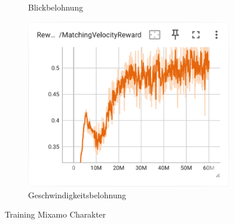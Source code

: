 \begin{figure}[H]
\begin{subfigure}{.49\textwidth}
      \caption{Blickbelohnung}
      \label{fig:106_look_reward}
    \end{subfigure}
    \begin{subfigure}{.49\textwidth}
      \centering  
      \includegraphics[width=\textwidth]{img/106_vel_reward}
      \caption{Geschwindigkeitsbelohnung}
      \label{fig:106_vel_reward}
    \end{subfigure}
 \caption{Training Mixamo Charakter}
  \label{fig:training_mixamo_charakter}
\end{figure}

